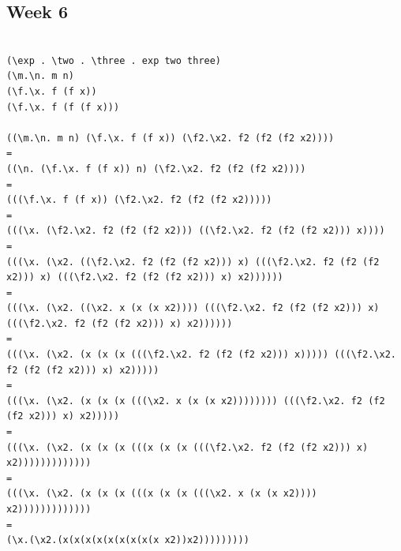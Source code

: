 \documentclass{article}
\theoremstyle{theorem}
\theoremstyle{definition}
\theoremstyle{remark}
\begin{document}
\subsection{Week 6}
\begin{verbatim}

(\exp . \two . \three . exp two three)
(\m.\n. m n)
(\f.\x. f (f x))
(\f.\x. f (f (f x)))

((\m.\n. m n) (\f.\x. f (f x)) (\f2.\x2. f2 (f2 (f2 x2))))
=
((\n. (\f.\x. f (f x)) n) (\f2.\x2. f2 (f2 (f2 x2))))
=
(((\f.\x. f (f x)) (\f2.\x2. f2 (f2 (f2 x2)))))
=
(((\x. (\f2.\x2. f2 (f2 (f2 x2))) ((\f2.\x2. f2 (f2 (f2 x2))) x))))
=
(((\x. (\x2. ((\f2.\x2. f2 (f2 (f2 x2))) x) (((\f2.\x2. f2 (f2 (f2 x2))) x) (((\f2.\x2. f2 (f2 (f2 x2))) x) x2))))))
=
(((\x. (\x2. ((\x2. x (x (x x2)))) (((\f2.\x2. f2 (f2 (f2 x2))) x) (((\f2.\x2. f2 (f2 (f2 x2))) x) x2))))))
=
(((\x. (\x2. (x (x (x (((\f2.\x2. f2 (f2 (f2 x2))) x))))) (((\f2.\x2. f2 (f2 (f2 x2))) x) x2)))))
=
(((\x. (\x2. (x (x (x (((\x2. x (x (x x2)))))))) (((\f2.\x2. f2 (f2 (f2 x2))) x) x2)))))
=
(((\x. (\x2. (x (x (x (((x (x (x (((\f2.\x2. f2 (f2 (f2 x2))) x) x2)))))))))))))
=
(((\x. (\x2. (x (x (x (((x (x (x (((\x2. x (x (x x2)))) x2)))))))))))))
=
(\x.(\x2.(x(x(x(x(x(x(x(x(x x2))x2)))))))))
\end{verbatim}
\end{document}
